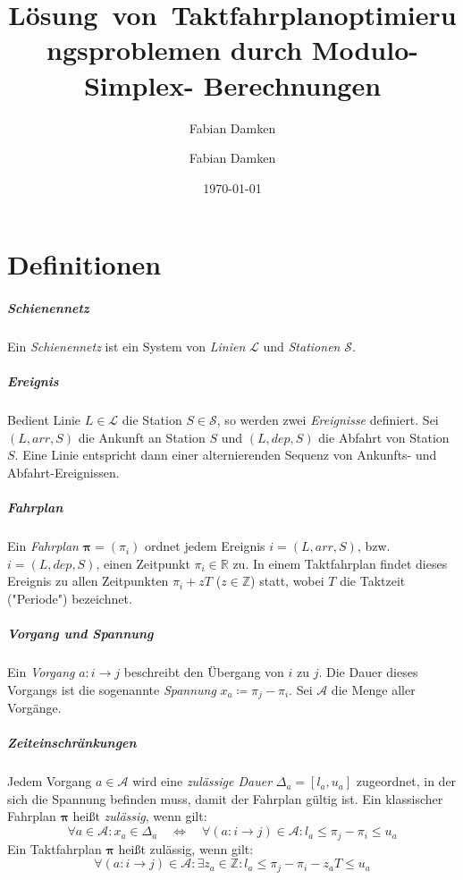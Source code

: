 \documentclass[accentcolor = tud11b, colorbacktitle, a4paper, 11pt, tudmathserif]{tudexercise}
\title{Lösung~von~Takt\-fahr\-plan\-op\-ti\-mie\-rungs\-pro\-ble\-men durch Mo\-du\-lo-Sim\-plex- Be\-rech\-nung\-en}
\subtitle{Fabian Damken}
\author{Fabian Damken}
\date{\today}
\newcommand{\arr}{\mathit{arr}}
\newcommand{\dep}{\mathit{dep}}
\newcommand{\R}{\ensuremath{\mathbb{R}}}
\newcommand{\Z}{\ensuremath{\mathbb{Z}}}
\renewcommand{\vec}[1]{\boldsymbol{\mathbf{#1}}}
\begin{document}
	

	\maketitle

	\section*{Definitionen}
		\subparagraph{Schienennetz}
		Ein \emph{Schienennetz} ist ein System von \emph{Linien} \(\mathcal{L}\) und \emph{Stationen} \(\mathcal{S}\).
	
		\subparagraph{Ereignis}
		Bedient Linie \( L \in \mathcal{L} \) die Station \( S \in \mathcal{S} \), so werden zwei \emph{Ereignisse} definiert. Sei \( (L, \arr, S) \) die Ankunft an Station \(S\) und \( (L, \dep, S) \) die Abfahrt von Station \(S\). Eine Linie entspricht dann einer alternierenden Sequenz von Ankunfts- und Abfahrt-Ereignissen.
	
		\subparagraph{Fahrplan}
		Ein \emph{Fahrplan} \( \vec{\pi} = (\pi_i) \) ordnet jedem Ereignis \( i = (L, \arr, S) \), bzw. \( i = (L, \dep, S) \), einen Zeitpunkt \( \pi_i \in \R \) zu. In einem Taktfahrplan findet dieses Ereignis zu allen Zeitpunkten \( \pi_i + z T \) (\( z \in \Z \)) statt, wobei \( T \) die Taktzeit ("Periode") bezeichnet.
		
		\subparagraph{Vorgang und Spannung}
		Ein \emph{Vorgang} \( a : i \to j \) beschreibt den Übergang von \(i\) zu \(j\). Die Dauer dieses Vorgangs ist die sogenannte \emph{Spannung} \( x_a \coloneqq \pi_j - \pi_i \). Sei \(\mathcal{A}\) die Menge aller Vorgänge.
		
		\subparagraph{Zeiteinschränkungen}
		Jedem Vorgang \( a \in \mathcal{A} \) wird eine \emph{zulässige Dauer} \( \Delta_a = [l_a, u_a] \) zugeordnet, in der sich die Spannung befinden muss, damit der Fahrplan gültig ist. Ein klassischer Fahrplan \(\vec{\pi}\) heißt \emph{zulässig}, wenn gilt:
		\begin{equation*}
			\forall a \in \mathcal{A} : x_a \in \Delta_a \quad\iff\quad \forall (a : i \to j) \in \mathcal{A} : l_a \leq \pi_j - \pi_i \leq u_a
		\end{equation*}
		Ein Taktfahrplan \( \vec{\pi} \) heißt zulässig, wenn gilt:
		\begin{equation*}
			\forall (a : i \to j) \in \mathcal{A} : \exists z_a \in \Z : l_a \leq \pi_j - \pi_i - z_a T \leq u_a
		\end{equation*}
		
\end{document}
